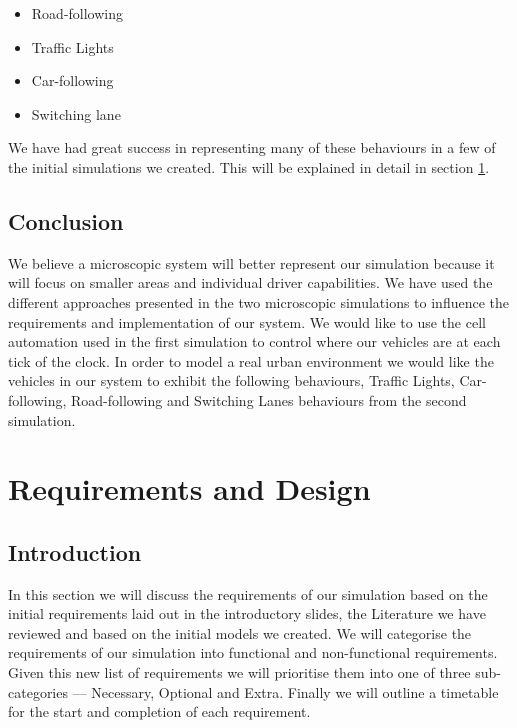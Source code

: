 \documentclass{article}
\begin{document}
	\begin{itemize}
		\item Road-following
		\item Traffic Lights
		\item Car-following
		\item Switching lane
	\end{itemize}
	We have had great success in representing many of these behaviours in a few of the initial simulations we created. 
	This will be explained in detail in section \ref{RequirementsAndDeisgn}. 
	
	
	\subsection{Conclusion}
	We believe a microscopic system will better represent our simulation because it will focus on smaller areas and individual driver capabilities. 
	We have used the different approaches presented in the two microscopic simulations to influence the requirements and implementation of our system. 
	We would like to use the cell automation used in the first simulation to control where our vehicles are at each tick of the clock. 
	In order to model a real urban environment we would like the vehicles in our system to exhibit the following behaviours, Traffic Lights, Car-following, Road-following and Switching Lanes behaviours from the second simulation.
	
	
	\section{Requirements and Design}\label{RequirementsAndDeisgn}
	
	\subsection{Introduction}
	In this section we will discuss the requirements of our simulation based on the initial requirements laid out in the introductory slides, the Literature we have reviewed and based on the initial models we created. 
	We will categorise the requirements of our simulation into functional and non-functional requirements. Given this new list of requirements we will prioritise them into one of three sub-categories  --- Necessary, Optional and Extra. 
	Finally we will outline a timetable for the start and completion of each requirement.  
	
\end{document}
